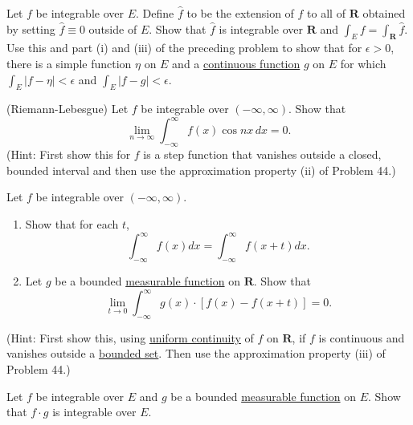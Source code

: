   \begin{exercise}[Royden 4.45]
    Let $f$ be integrable over $E$. Define $\hat{f}$ to be the extension of $f$ to all of $\mathbf{R}$ obtained by setting $\hat{f} \equiv 0$ outside of $E$. Show that $\hat{f}$ is integrable over $\mathbf{R}$ and $\int_E f = \int_{\mathbf{R}} \hat{f}$. Use this and part (i) and (iii) of the preceding problem to show that for $\epsilon > 0$, there is a simple function $\eta$ on $E$ and a \hyperref[pst-def:continuous_func]{continuous function} $g$ on $E$ for which $\int_E |f - \eta| < \epsilon$ and $\int_E |f - g| < \epsilon$.
  \end{exercise}

  \begin{exercise}[Royden 4.46]
    (Riemann-Lebesgue) Let $f$ be integrable over $(-\infty, \infty)$. Show that
    \begin{equation*}
      \lim_{n \to \infty} \int_{-\infty}^{\infty} f(x) \cos nx \, dx = 0.
    \end{equation*}
    (Hint: First show this for $f$ is a step function that vanishes outside a closed, bounded interval and then use the approximation property (ii) of Problem 44.)
  \end{exercise}

  \begin{exercise}[Royden 4.47]
    Let $f$ be integrable over $(-\infty, \infty)$.
    \begin{enumerate}
      \item Show that for each $t$,
      \begin{equation*}
        \int_{-\infty}^{\infty} f(x) dx = \int_{-\infty}^{\infty} f(x + t) dx.
      \end{equation*}
      \item Let $g$ be a bounded \hyperref[def:measurable-function]{measurable function} on $\mathbf{R}$. Show that
      \begin{equation*}
        \lim_{t \to 0} \int_{-\infty}^{\infty} g(x) \cdot [f(x) - f(x + t)] = 0.
      \end{equation*}
    \end{enumerate}
    (Hint: First show this, using \hyperref[real-def:uniform-continuity]{uniform continuity} of $f$ on $\mathbf{R}$, if $f$ is continuous and vanishes outside a \hyperref[pst-def:bounded-set]{bounded set}. Then use the approximation property (iii) of Problem 44.)
  \end{exercise}

  \begin{exercise}[Royden 4.48]
    Let $f$ be integrable over $E$ and $g$ be a bounded \hyperref[def:measurable-function]{measurable function} on $E$. Show that $f \cdot g$ is integrable over $E$.
  \end{exercise}

